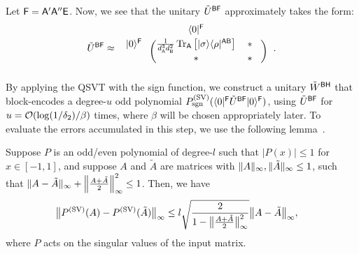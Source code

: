 Let ${\mathsf{F}} = {\mathsf{A}}'{\mathsf{A}}''{\mathsf{E}}$.
Now, we see that the unitary $\tilde{U}^{{\mathsf{B}}{\mathsf{F}}}$ approximately takes the form:
\begin{align}
        \til{U}^{\sB\sF}
        \approx \hspace{1mm}
\begin{blockarray}{ccc}
 & \bra{0}^\sF &  & \vspace{1mm}\\
\begin{block}{c(cc)}
  \ket{0}^\sF \hspace*{1mm} & \f{1}{d_\sA^3 d_\sB^2}\tr_\sA\big[\ketbra{\sigma}{\rho}^{\sA\sB}\big] & \hspace{0mm} * \hspace{3mm}\\
   \hspace*{1mm} & * & \hspace{0mm} * \hspace{3mm}\\
\end{block}
\end{blockarray}\hspace{2.5mm}.
\end{align}
By applying the QSVT with the sign function, we construct a unitary $\tilde{W}^{{\mathsf{B}}{\mathsf{H}}}$ that block-encodes a degree-$u$ odd polynomial $P_{\mathrm{sgn}}^{(\rm SV)}(\langle0|^{\mathsf{F}}\tilde{U}^{{\mathsf{B}}{\mathsf{F}}}|0\rangle^{\mathsf{F}})$, using $\tilde{U}^{{\mathsf{B}}{\mathsf{F}}}$ for $u={\mathcal{O}}(\log(1/\delta_2)/\beta)$ times, where $\beta$ will be chosen appropriately later.
To evaluate the errors accumulated in this step, we use the following lemma~\cite{Gilyn2019thesis, gilyen2022improvedfidelity}.


\begin{lemma}
\label{lem:robstness of QSVT}
Suppose $P$ is an odd/even polynomial of degree-$l$ such that 
$|P(x)| \leq 1$ for $x\in[-1, 1]$, and suppose $A$ and $\tilde{A}$ are matrices with $\|A\|_\infty, \|\tilde{A}\|_\infty \leq 1$, such that $\|A-\tilde{A}\|_\infty + \Big\|\frac{A+\tilde{A}}{2}\Big\|_\infty^2 \leq 1$. Then, we have 
\begin{align}
    \big\|P^{(\rm SV)}(A) - P^{(\rm SV)}(\tilde{A})\big\|_\infty &\leq l\sqrt{\frac{2}{1-\big\|\frac{A+\tilde{A}}{2}\big\|_\infty^2}}\big\|A-\tilde{A}\big\|_\infty,
\end{align}
where $P$ acts on the singular values of the input matrix.
\end{lemma}


